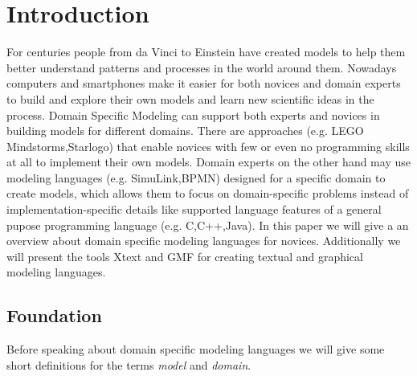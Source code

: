 \documentclass[runningheads,a4paper]{llncs}
\begin{document}
\section{Introduction}
\label{sec:introduction}
For centuries people from da Vinci to Einstein have created models to help them better 
understand patterns and processes in the world around them. 
Nowadays computers and smartphones make it easier for both novices and domain experts to build 
and explore their own models and learn new scientific ideas in the process.
Domain Specific Modeling can support both experts and novices in building models for different domains.
There are approaches (e.g. LEGO Mindstorms,Starlogo) that enable novices with few or even no programming 
skills at all to implement their own models.
Domain experts on the other hand may use modeling languages (e.g. SimuLink,BPMN) designed for a specific domain to create models, 
which allows them to focus on domain-specific problems instead of implementation-specific details like supported 
language features of a general pupose programming language (e.g. C,C++,Java).
In this paper we will give a an overview about domain specific modeling languages for novices.
Additionally we will present the tools Xtext and GMF for creating textual and graphical modeling languages. 


\subsection{Foundation}
\label{subsec:introduction}
Before speaking about domain specific modeling languages we will give some short definitions for the  
terms \emph{model} and \emph{domain}.
\end{document}

